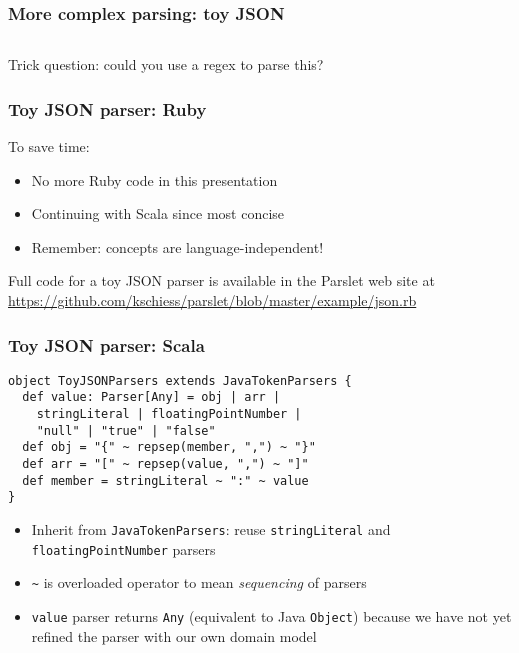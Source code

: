 
\begin{frame}[fragile]
  \frametitle{More complex parsing: toy JSON}

  \inputminted{json}{javascript/example.json}

  Trick question: could you use a regex to parse this?
\end{frame}



\begin{frame}
  \frametitle{Toy JSON parser: Ruby}

  To save time:
  \begin{itemize}
    \item No more Ruby code in this presentation
    \item Continuing with Scala since most concise
    \item Remember: concepts are language-independent!
  \end{itemize}

  Full code for a toy JSON parser is available in the Parslet web site at \url{https://github.com/kschiess/parslet/blob/master/example/json.rb}
\end{frame}


\begin{frame}[fragile]
  \frametitle{Toy JSON parser: Scala}

  \begin{verbatim}
object ToyJSONParsers extends JavaTokenParsers {
  def value: Parser[Any] = obj | arr |
    stringLiteral | floatingPointNumber |
    "null" | "true" | "false"
  def obj = "{" ~ repsep(member, ",") ~ "}"
  def arr = "[" ~ repsep(value, ",") ~ "]"
  def member = stringLiteral ~ ":" ~ value
}
  \end{verbatim}

  \begin{itemize}
    \item Inherit from \texttt{JavaTokenParsers}: reuse \texttt{stringLiteral} and \texttt{floatingPointNumber} parsers
    \item \texttt{\~} is overloaded operator to mean \emph{sequencing} of parsers
    \item \texttt{value} parser returns \texttt{Any} (equivalent to Java \texttt{Object}) because we have not yet refined the parser with our own domain model
  \end{itemize}
\end{frame}

